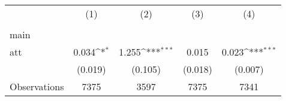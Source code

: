 {
\def\sym#1{\ifmmode^{#1}\else\(^{#1}\)\fi}
\begin{tabular}{l*{4}{c}}
\hline\hline
                    &\multicolumn{1}{c}{(1)}&\multicolumn{1}{c}{(2)}&\multicolumn{1}{c}{(3)}&\multicolumn{1}{c}{(4)}\\
                    &\multicolumn{1}{c}{} &\multicolumn{1}{c}{} &\multicolumn{1}{c}{} &\multicolumn{1}{c}{} \\
\hline
main                &                     &                     &                     &                     \\
att                 &       0.034\sym{*}  &       1.255\sym{***}&       0.015         &       0.023\sym{***}\\
                    &     (0.019)         &     (0.105)         &     (0.018)         &     (0.007)         \\
\hline
Observations        &        7375         &        3597         &        7375         &        7341         \\
\hline\hline
\end{tabular}
}
